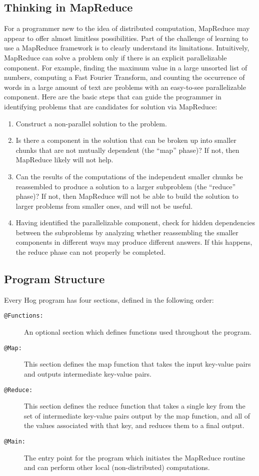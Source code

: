 \documentclass{article} \usepackage{fancyhdr, multicol}
\begin{document}
\subsection*{Thinking in MapReduce}
\label{sec:mapreduce_intro}
For a programmer new to the idea of distributed computation, MapReduce may appear to offer almost limitless possibilities. Part of the challenge of learning to use a MapReduce framework is to clearly understand its limitations. Intuitively, MapReduce can solve a problem only if there is an explicit parallelizable component. For example, finding the maximum value in a large unsorted list of numbers, computing a Fast Fourier Transform, and counting the occurrence of words in a large amount of text are problems with an easy-to-see parallelizable component. Here are the basic steps that can guide the programmer in identifying problems that are candidates for solution via MapReduce:
\begin{enumerate}
\item Construct a non-parallel solution to the problem.
\item Is there a component in the solution that can be broken up into smaller chunks that are not mutually dependent (the ``map'' phase)? If not, then MapReduce likely will not help.
\item Can the results of the computations of the independent smaller chunks be reassembled to produce a solution to a larger subproblem (the ``reduce'' phase)? If not, then MapReduce will not be able to build the solution to larger problems from smaller ones, and will not be useful.
\item Having identified the parallelizable component, check for hidden dependencies between the subproblems by analyzing whether reassembling the smaller components in different ways may produce different answers. If this happens, the reduce phase can not properly be completed.
\end{enumerate}

\subsection*{Program Structure} %
\label{sub:program_structure}
Every Hog program has four sections, defined in the following order:
\begin{description}
\item[\tt @Functions\rm:] An optional section which defines functions used throughout the program.
\item[\tt @Map\rm:] This section defines the map function that takes the input key-value pairs and outputs intermediate key-value pairs.
\item[\tt @Reduce\rm:] This section defines the reduce function that takes a single key from the set of intermediate key-value pairs output by the map function, and all of the values associated with that key, and reduces them to a final output.
\item [\tt @Main\rm:] The entry point for the program which initiates the MapReduce routine and can perform other local (non-distributed) computations.
\end{description}
\end{document}
